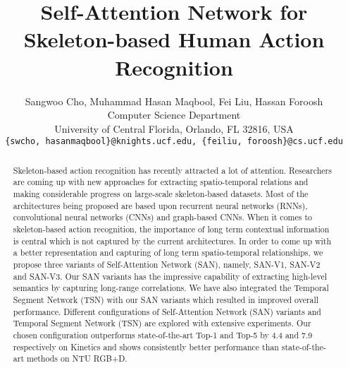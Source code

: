\documentclass[10pt,twocolumn,letterpaper]{article}
\begin{document}
\setlength{\belowcaptionskip}{-\baselineskip}\addtolength{\belowcaptionskip}{1.1ex}

\title{Self-Attention Network for Skeleton-based Human Action Recognition}

\author{Sangwoo Cho, \hspace{0.3cm} Muhammad Hasan Maqbool, \hspace{0.3cm} Fei Liu, \hspace{0.3cm} Hassan Foroosh \\
Computer Science Department\\
University of Central Florida, Orlando, FL 32816, USA\\
{\tt\small \{swcho, hasanmaqbool\}@knights.ucf.edu, \{feiliu, foroosh\}@cs.ucf.edu}
}


\maketitle
\ifwacvfinal\thispagestyle{empty}\fi

\begin{abstract}
    Skeleton-based action recognition has recently attracted a lot of attention. Researchers are coming up with new approaches for extracting spatio-temporal relations and making considerable progress on large-scale skeleton-based datasets. Most of the architectures being proposed are based upon recurrent neural networks (RNNs), convolutional neural networks (CNNs) and graph-based CNNs. When it comes to skeleton-based action recognition, the importance of long term contextual information is central which is not captured by the current architectures. In order to come up with a better representation and capturing of long term spatio-temporal relationships, we propose three variants of Self-Attention Network (SAN), namely, SAN-V1, SAN-V2 and SAN-V3. Our SAN variants has the impressive capability of extracting high-level semantics by capturing long-range correlations. We have also integrated the Temporal Segment Network (TSN) with our SAN variants which resulted in improved overall performance.  
	Different configurations of Self-Attention Network (SAN) variants and Temporal Segment Network (TSN) are explored with extensive experiments. Our chosen configuration outperforms state-of-the-art Top-1 and Top-5 by 4.4 and 7.9 respectively on Kinetics and shows consistently better performance than state-of-the-art methods on NTU RGB+D.
\end{abstract}
\end{document}
